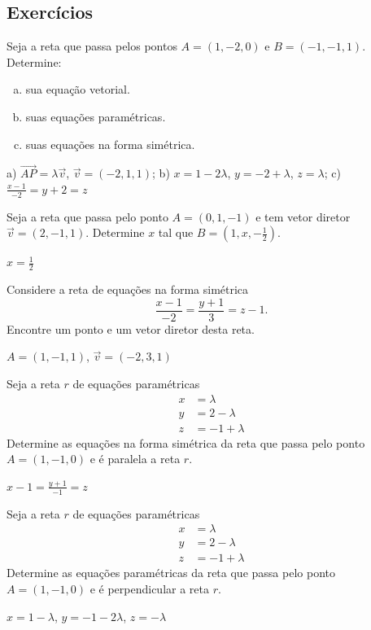 \subsection*{Exercícios}

\begin{exer}
  Seja a reta que passa pelos pontos $A=(1,-2,0)$ e $B=(-1,-1,1)$. Determine:
  \begin{enumerate}[a)]
  \item sua equação vetorial.
  \item suas equações paramétricas.
  \item suas equações na forma simétrica.
  \end{enumerate}
\end{exer}
\begin{resp}
  a) $\overrightarrow{AP}=\lambda\vec{v}$, $\vec{v}=(-2,1,1)$; b) $x=1-2\lambda$, $y=-2+\lambda$, $z=\lambda$; c) $\frac{x-1}{-2}=y+2=z$
\end{resp}

\begin{exer}
  Seja a reta que passa pelo ponto $A=(0,1,-1)$ e tem vetor diretor $\vec{v}=(2,-1,1)$. Determine $x$ tal que $B=(1,x,-\frac{1}{2})$.
\end{exer}
\begin{resp}
  $x=\frac{1}{2}$
\end{resp}

\begin{exer}
  Considere a reta de equações na forma simétrica
  \begin{equation}
    \frac{x-1}{-2}=\frac{y+1}{3}=z-1.
  \end{equation}
  Encontre um ponto e um vetor diretor desta reta.
\end{exer}
\begin{resp}
  $A=(1,-1,1)$, $\vec{v}=(-2,3,1)$
\end{resp}

\begin{exer}
  Seja a reta $r$ de equações paramétricas
  \begin{align}
    x &= \lambda\\
    y &= 2-\lambda\\
    z &= -1+\lambda
  \end{align}
  Determine as equações na forma simétrica da reta que passa pelo ponto $A=(1,-1,0)$ e é paralela a reta $r$.
\end{exer}
\begin{resp}
  $x-1=\frac{y+1}{-1}=z$
\end{resp}

\begin{exer}
  Seja a reta $r$ de equações paramétricas
  \begin{align}
    x &= \lambda\\
    y &= 2-\lambda\\
    z &= -1+\lambda
  \end{align}
  Determine as equações paramétricas da reta que passa pelo ponto $A=(1,-1,0)$ e é perpendicular a reta $r$.
\end{exer}
\begin{resp}
  $x=1-\lambda$, $y=-1-2\lambda$, $z=-\lambda$
\end{resp}
